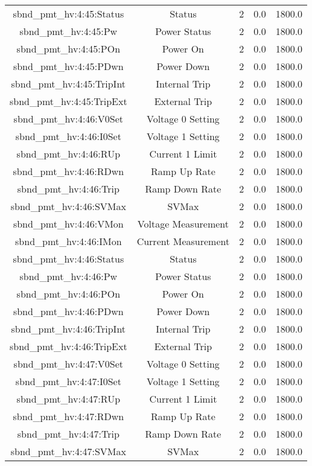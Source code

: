 \begin{center}
\begin{longtable}{c | c c c c }
sbnd\_pmt\_hv:4:45:Status & Status & 2 & 0.0 & 1800.0\\ 
sbnd\_pmt\_hv:4:45:Pw & Power Status & 2 & 0.0 & 1800.0\\ 
sbnd\_pmt\_hv:4:45:POn & Power On & 2 & 0.0 & 1800.0\\ 
sbnd\_pmt\_hv:4:45:PDwn & Power Down & 2 & 0.0 & 1800.0\\ 
sbnd\_pmt\_hv:4:45:TripInt & Internal Trip & 2 & 0.0 & 1800.0\\ 
sbnd\_pmt\_hv:4:45:TripExt & External Trip & 2 & 0.0 & 1800.0\\ 
sbnd\_pmt\_hv:4:46:V0Set & Voltage 0 Setting & 2 & 0.0 & 1800.0\\ 
sbnd\_pmt\_hv:4:46:I0Set & Voltage 1 Setting & 2 & 0.0 & 1800.0\\ 
sbnd\_pmt\_hv:4:46:RUp & Current 1 Limit & 2 & 0.0 & 1800.0\\ 
sbnd\_pmt\_hv:4:46:RDwn & Ramp Up Rate & 2 & 0.0 & 1800.0\\ 
sbnd\_pmt\_hv:4:46:Trip & Ramp Down Rate & 2 & 0.0 & 1800.0\\ 
sbnd\_pmt\_hv:4:46:SVMax & SVMax & 2 & 0.0 & 1800.0\\ 
sbnd\_pmt\_hv:4:46:VMon & Voltage Measurement & 2 & 0.0 & 1800.0\\ 
sbnd\_pmt\_hv:4:46:IMon & Current Measurement & 2 & 0.0 & 1800.0\\ 
sbnd\_pmt\_hv:4:46:Status & Status & 2 & 0.0 & 1800.0\\ 
sbnd\_pmt\_hv:4:46:Pw & Power Status & 2 & 0.0 & 1800.0\\ 
sbnd\_pmt\_hv:4:46:POn & Power On & 2 & 0.0 & 1800.0\\ 
sbnd\_pmt\_hv:4:46:PDwn & Power Down & 2 & 0.0 & 1800.0\\ 
sbnd\_pmt\_hv:4:46:TripInt & Internal Trip & 2 & 0.0 & 1800.0\\ 
sbnd\_pmt\_hv:4:46:TripExt & External Trip & 2 & 0.0 & 1800.0\\ 
sbnd\_pmt\_hv:4:47:V0Set & Voltage 0 Setting & 2 & 0.0 & 1800.0\\ 
sbnd\_pmt\_hv:4:47:I0Set & Voltage 1 Setting & 2 & 0.0 & 1800.0\\ 
sbnd\_pmt\_hv:4:47:RUp & Current 1 Limit & 2 & 0.0 & 1800.0\\ 
sbnd\_pmt\_hv:4:47:RDwn & Ramp Up Rate & 2 & 0.0 & 1800.0\\ 
sbnd\_pmt\_hv:4:47:Trip & Ramp Down Rate & 2 & 0.0 & 1800.0\\ 
sbnd\_pmt\_hv:4:47:SVMax & SVMax & 2 & 0.0 & 1800.0\\ 

\end{longtable}
\end{center}
